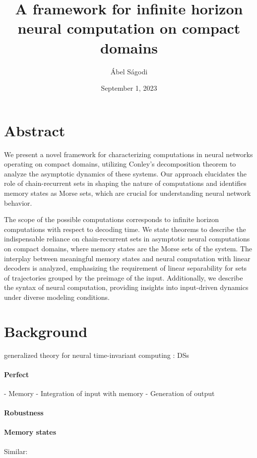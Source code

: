 \documentclass{scrartcl}
\title{A framework for infinite horizon neural computation on compact domains}
\author{\'Abel S\'agodi}
\date{September 1, 2023}
\theoremstyle{definition}
\theoremstyle{remark}
\begin{document}
\maketitle


\section*{Abstract}
We present a novel framework for characterizing computations in neural networks operating on compact domains, utilizing Conley’s decomposition theorem to analyze the asymptotic dynamics of these systems. Our approach elucidates the role of chain-recurrent sets in shaping the nature of computations and identifies memory states as Morse sets, which are crucial for understanding neural network behavior.

The scope of the possible computations corresponds to infinite horizon computations with respect to decoding time.
We state theorems to describe the indispensable reliance on chain-recurrent sets in asymptotic neural computations on compact domains, where memory states are the Morse sets of the system.
The interplay between meaningful memory states and neural computation with linear decoders is analyzed, emphasizing the requirement of linear separability for sets of trajectories grouped by the preimage of the input. 
Additionally, we describe the syntax of neural computation, providing insights into input-driven dynamics under diverse modeling conditions. 




\section{Background}%

generalized theory for neural time-invariant computing \citep{jaeger2021,jaeger2023theory}:
DSs



\paragraph{Perfect}
- Memory 
- Integration of input with memory
- Generation of output


\paragraph{Robustness}
\citep{Park2023a}



\paragraph{Memory states}
Similar: \citep{casey1996}
\end{document}
